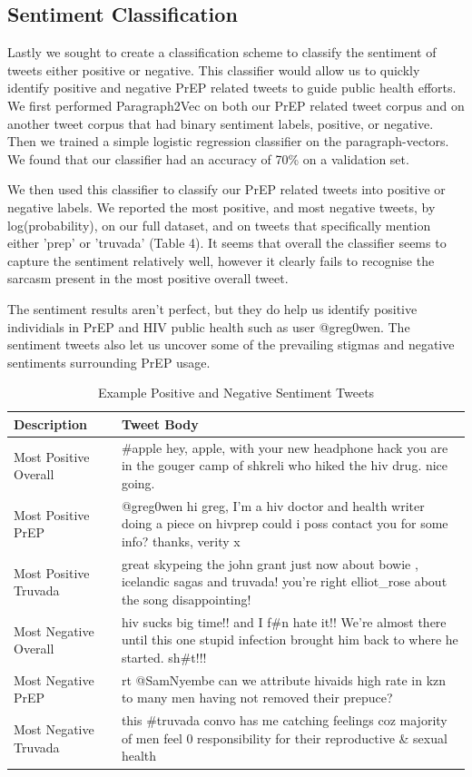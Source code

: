 \documentclass{sig-alternate-05-2015}
\begin{document}
\subsection{Sentiment Classification}

Lastly we sought to create a classification scheme to classify the sentiment of tweets either positive or negative. This classifier would allow us to quickly identify positive and negative PrEP related tweets to guide public health efforts. We first performed Paragraph2Vec on both our PrEP related tweet corpus and on another tweet corpus that had binary sentiment labels, positive, or negative. Then we trained a simple logistic regression classifier on the paragraph-vectors. We found that our classifier had an accuracy of 70\% on a validation set.

We then used this classifier to classify our PrEP related tweets into positive or negative labels. We reported the most positive, and most negative tweets, by log(probability), on our full dataset, and on tweets that specifically mention either 'prep' or 'truvada' (Table 4). It seems that overall the classifier seems to capture the sentiment relatively well, however it clearly fails to recognise the sarcasm present in the most positive overall tweet.

The sentiment results aren't perfect, but they do help us identify positive individials in PrEP and HIV public health such as user @greg0wen. The sentiment tweets also let us uncover some of the prevailing stigmas and negative sentiments surrounding PrEP usage.

\begin{table}
\centering
\caption{Example Positive and Negative Sentiment Tweets}
\begin{tabular}{|l|p{10cm}|} \hline
Description & Tweet Body\\ \hline
Most Positive Overall & \#apple hey, apple, with your new headphone hack you are in the gouger camp of shkreli who hiked the hiv drug. nice going.\\ \hline
Most Positive PrEP & @greg0wen hi greg, I'm a hiv doctor and health writer doing a piece on hivprep could i poss contact you for some info? thanks, verity x\\ \hline
Most Positive Truvada & great skypeing the john grant just now about bowie , icelandic sagas and truvada! you're right elliot\_rose about the song disappointing!\\ \hline

Most Negative Overall & hiv sucks big time!! and I f\#n hate it!! We're almost there until this one stupid infection brought him back to where he started. sh\#t!!!\\ \hline
Most Negative PrEP & rt @SamNyembe can we attribute hivaids high rate in kzn to many men having not removed their prepuce? \\ \hline
Most Negative Truvada & this \#truvada convo has me catching feelings coz majority of men feel 0 responsibility for their reproductive \& sexual health\\ \hline

\hline\end{tabular}
\end{table}
\end{document}
